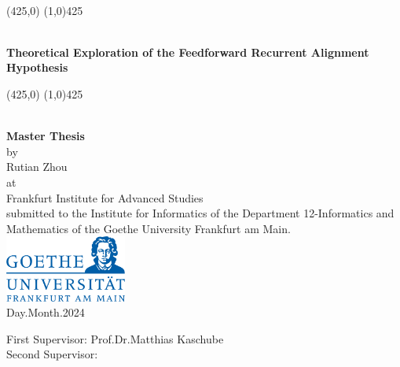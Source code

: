 \documentclass[11pt, class=article, crop=false]{standalone}
\begin{document}
	\begin{titlepage}
		\begin{center}
			\renewcommand{\baselinestretch}{1.5}
			\mbox{ }\\
			\begin{picture}(425,0) \linethickness{3pt} \line(1,0){425} \end{picture} \\
			\vspace{0.3cm}
			\huge
			\textbf{Theoretical Exploration of the Feedforward Recurrent Alignment Hypothesis}\\
			\vspace{0.0cm}
			\begin{picture}(425,0) \linethickness{3pt} \line(1,0){425} \end{picture} \\
			\vspace{0.6cm}
			\huge
			\textbf{Master Thesis}\\
			\vspace{0.4cm}
			\large
			by\\
			Rutian Zhou\\
			at\\
			Frankfurt Institute for Advanced Studies\\
			\vspace{0.4cm}
			\large
			submitted to the Institute for Informatics of the Department 12-Informatics and Mathematics of the Goethe University Frankfurt am Main.\\
			\vspace{0.5cm}
			\includegraphics[width=0.3\textwidth]{../figures/uni_logo.png}\\
			\vspace{0.5cm}
			Day.Month.2024
		\end{center}
		\vspace{0.5cm}
		First Supervisor: Prof.Dr.Matthias Kaschube\\
		Second Supervisor: 
	\end{titlepage}
\end{document}
